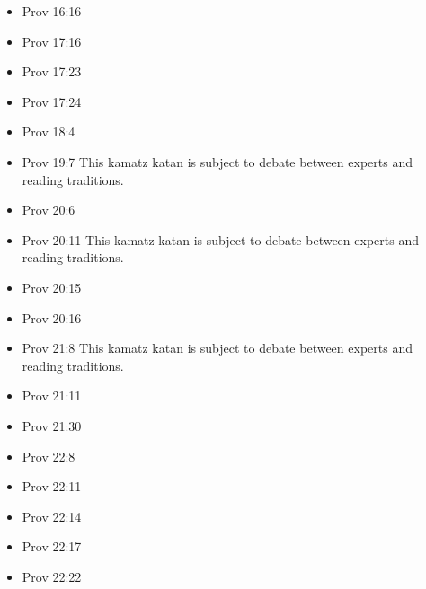 \documentclass[14pt]{article}
\begin{document}
\begin{multicols}{2}
\begin{itemize}
									\item Prov 16:16
									
									\item Prov 17:16
									
									\item Prov 17:23
									
									\item Prov 17:24
									
									\item Prov 18:4
									
									\item Prov 19:7 This kamatz katan is subject to debate between experts and reading traditions.
									
									\item Prov 20:6
									
									\item Prov 20:11 This kamatz katan is subject to debate between experts and reading traditions.
									
									\item Prov 20:15
									
									\item Prov 20:16
									
									\item Prov 21:8 This kamatz katan is subject to debate between experts and reading traditions.
									
									\item Prov 21:11
									
									\item Prov 21:30
									
									\item Prov 22:8
									
									\item Prov 22:11
									
									\item Prov 22:14
									
									\item Prov 22:17
									
									\item Prov 22:22
									

\end{itemize}
\end{multicols}
\end{document}
